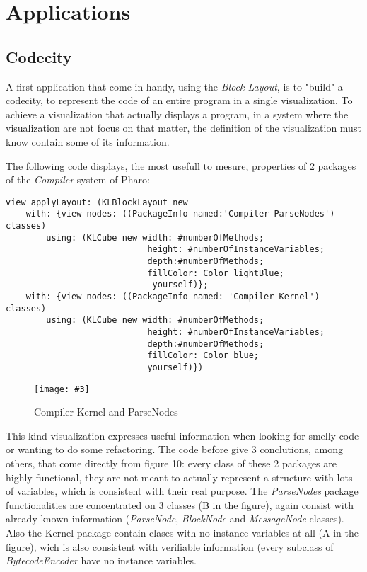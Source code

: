 \documentclass{sig-alternate}
\newcommand{\fig}[4]{
	\begin{figure}[#1]
		\centering
		\texttt{[image: \#3]}
		\caption{\label{fig:#3}#4}
	\end{figure}}
\newcommand{\seclabel}[1]{\label{sec:#1}}
\begin{document}
\section{Applications} \seclabel{applications}

\subsection{Codecity}
A first application that come in handy, using the \emph{Block Layout},
is to "build" a codecity, to represent the code of an entire program
in a single visualization. To achieve a visualization that actually 
displays a program, in a system where the visualization are not focus
on that matter, the definition of the visualization must know contain
some of its information.

The following code displays, the most usefull to mesure, properties of 
2 packages of the \emph{Compiler} system of Pharo:
\begin{lstlisting}
view applyLayout: (KLBlockLayout new
	with: {view nodes: ((PackageInfo named:'Compiler-ParseNodes') classes) 
		using: (KLCube new width: #numberOfMethods; 
							height: #numberOfInstanceVariables; 
							depth:#numberOfMethods;
							fillColor: Color lightBlue;
							 yourself)};
	with: {view nodes: ((PackageInfo named: 'Compiler-Kernel') classes)
		using: (KLCube new width: #numberOfMethods; 
							height: #numberOfInstanceVariables; 
							depth:#numberOfMethods;
							fillColor: Color blue;
							yourself)})
\end{lstlisting}

\fig{}{0.55}{figure10.png}{Compiler Kernel and ParseNodes}

This kind visualization expresses useful information when looking for
smelly code or wanting to do some refactoring. The code before give 3 
conclutions, among others, that come directly from figure 10:
every class of these 2 packages are highly functional, they are not
meant to actually represent a structure with lots of variables, which
is consistent with their real purpose. The \emph{ParseNodes} package
functionalities are concentrated on 3 classes (B in the figure), 
again consist with already known information (\emph{ParseNode}, 
\emph{BlockNode} and \emph{MessageNode} classes). Also the {Kernel} 
package contain clases with no instance variables at all (A in the figure),
wich is also consistent with verifiable information (every subclass of 
\emph{BytecodeEncoder} have no instance variables. 
\end{document}
